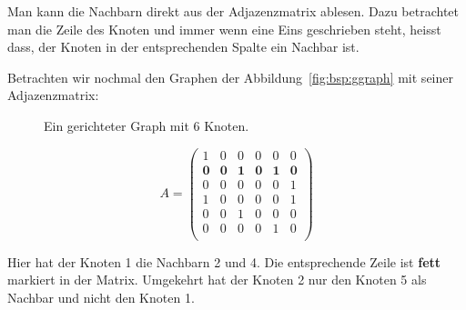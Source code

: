Man kann die Nachbarn direkt aus der Adjazenzmatrix ablesen. 
Dazu betrachtet man die Zeile des Knoten und immer wenn eine Eins geschrieben steht, heisst dass, der Knoten in der entsprechenden Spalte ein Nachbar ist.

\begin{mbsp}
Betrachten wir nochmal den Graphen der Abbildung~\ref{fig:bsp:ggraph} mit seiner Adjazenzmatrix:


\begin{figure}[htb]
\begin{center}

\caption{Ein gerichteter Graph mit 6 Knoten.
}
\label{fig:bsp:ggraph2}
\end{center}
\end{figure}



\[ 
A =  \begin{pmatrix}
  1 & 0 & 0 & 0 & 0 & 0 \\
  \textbf{0} & \textbf{0} & \textbf{1} & \textbf{0} & \textbf{1} & \textbf{0} \\
  0 & 0 & 0 & 0 & 0 & 1 \\
  1 & 0 & 0 & 0 & 0 & 1 \\
  0 & 0 & 1 & 0 & 0 & 0 \\
  0 & 0 & 0 & 0 & 1 & 0 \\
 \end{pmatrix}
  \]
  
  
Hier hat der Knoten 1 die Nachbarn 2 und 4.
Die entsprechende Zeile ist \textbf{fett} markiert in der Matrix.
Umgekehrt hat der Knoten 2 nur den Knoten 5 als Nachbar und nicht den Knoten 1.
\end{mbsp}

